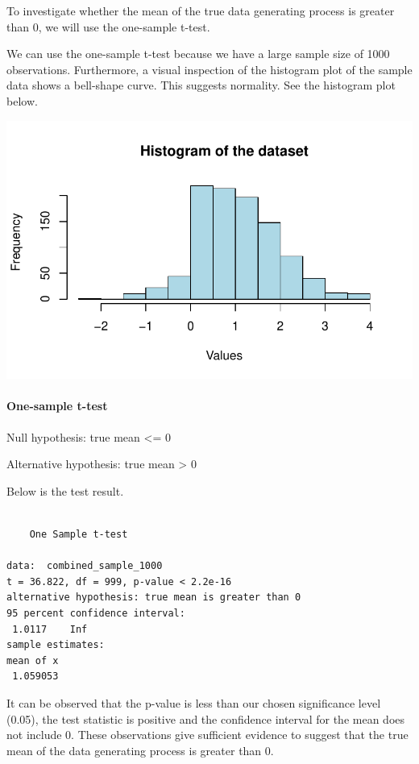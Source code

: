 \documentclass[
  letterpaper,
  DIV=11,
  numbers=noendperiod]{scrartcl}
\let\oldparagraph\paragraph
\renewcommand{\paragraph}[1]{\oldparagraph{#1}\mbox{}}
\begin{document}
To investigate whether the mean of the true data generating process is
greater than 0, we will use the one-sample t-test.

We can use the one-sample t-test because we have a large sample size of
1000 observations. Furthermore, a visual inspection of the histogram
plot of the sample data shows a bell-shape curve. This suggests
normality. See the histogram plot below.

\includegraphics{report_files/figure-pdf/unnamed-chunk-2-1.pdf}

\hypertarget{one-sample-t-test}{%
\paragraph{One-sample t-test}\label{one-sample-t-test}}

Null hypothesis: true mean \textless= 0

Alternative hypothesis: true mean \textgreater{} 0

Below is the test result.

\begin{verbatim}

    One Sample t-test

data:  combined_sample_1000
t = 36.822, df = 999, p-value < 2.2e-16
alternative hypothesis: true mean is greater than 0
95 percent confidence interval:
 1.0117    Inf
sample estimates:
mean of x 
 1.059053 
\end{verbatim}

It can be observed that the p-value is less than our chosen significance
level (0.05), the test statistic is positive and the confidence interval
for the mean does not include 0. These observations give sufficient
evidence to suggest that the true mean of the data generating process is
greater than 0.
\end{document}
